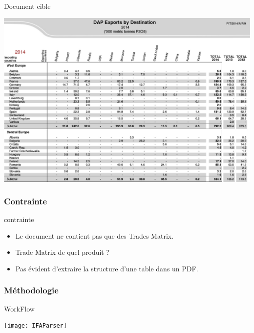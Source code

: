 \documentclass[handout]{beamer}
\begin{document}
\begin{frame}
	\begin{block}{Document cible}
    		\begin{center}
    		\includegraphics[width=\textwidth, height=0.7\textheight, keepaspectratio]{DocIFA}
    		\end{center}
	\end{block}
\end{frame}

\begin{frame}
  \frametitle{Contrainte}
  \begin{block}{contrainte}
  	\begin{itemize}
    		\item Le document ne contient pas que des Trades Matrix.
    		\item Trade Matrix de quel produit ?
    		\item Pas évident d'extraire la structure d'une table dans un PDF.
  	\end{itemize}
  \end{block}
\end{frame}

\begin{frame}
  \frametitle{Méthodologie}
	\begin{block}{WorkFlow}
    		\begin{center}
    		\texttt{[image: IFAParser]}
    		\end{center}
	\end{block}
\end{frame}
\end{document}
